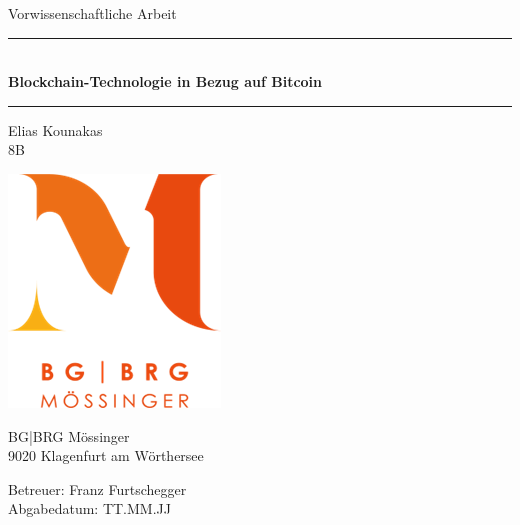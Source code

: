 

\begin{titlepage}
  \begin{center}
    \vspace*{-4cm}
    Vorwissenschaftliche Arbeit
    \vspace{1cm}

    \rule{440pt}{0.1pt}\\
    \vspace{0.5cm}
    \textbf{\Huge Blockchain-Technologie in Bezug auf Bitcoin}\\
    \rule{440pt}{0.1pt}

    \large
    \vspace{2cm}
    Elias Kounakas\\
    8B
    \vspace{2cm}

    \includegraphics{sources/images/mossinger-logo.png}

    \vspace{2cm}
    BG|BRG Mössinger\\
    9020 Klagenfurt am Wörthersee
    \vspace{2cm}

    \vfill
    Betreuer: Franz Furtschegger\\
    Abgabedatum: TT.MM.JJ
    \vspace*{-5cm}
    \end{center}
\end{titlepage}